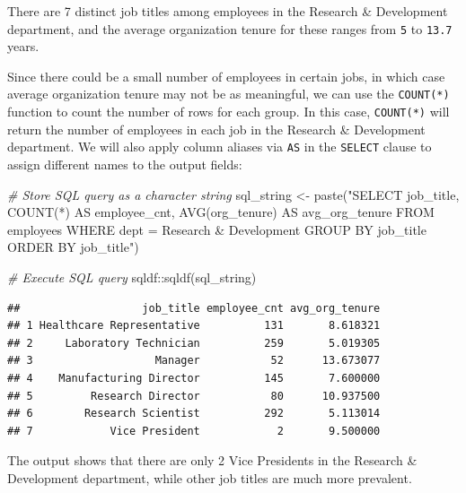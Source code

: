 \documentclass[
]{book}
\newenvironment{Shaded}{\begin{snugshade}}{\end{snugshade}}
\newcommand{\CommentTok}[1]{\textcolor[rgb]{0.56,0.35,0.01}{\textit{#1}}}
\newcommand{\FunctionTok}[1]{\textcolor[rgb]{0.00,0.00,0.00}{#1}}
\newcommand{\NormalTok}[1]{#1}
\newcommand{\OtherTok}[1]{\textcolor[rgb]{0.56,0.35,0.01}{#1}}
\newcommand{\SpecialCharTok}[1]{\textcolor[rgb]{0.00,0.00,0.00}{#1}}
\newcommand{\StringTok}[1]{\textcolor[rgb]{0.31,0.60,0.02}{#1}}
\begin{document}
There are 7 distinct job titles among employees in the Research \& Development department, and the average organization tenure for these ranges from \texttt{5} to \texttt{13.7} years.

Since there could be a small number of employees in certain jobs, in which case average organization tenure may not be as meaningful, we can use the \texttt{COUNT(*)} function to count the number of rows for each group. In this case, \texttt{COUNT(*)} will return the number of employees in each job in the Research \& Development department. We will also apply column aliases via \texttt{AS} in the \texttt{SELECT} clause to assign different names to the output fields:

\begin{Shaded}
\begin{Highlighting}[]
\CommentTok{\# Store SQL query as a character string}
\NormalTok{sql\_string }\OtherTok{\textless{}{-}} \FunctionTok{paste}\NormalTok{(}\StringTok{"SELECT}
\StringTok{                      job\_title,}
\StringTok{                      COUNT(*) AS employee\_cnt,}
\StringTok{                      AVG(org\_tenure) AS avg\_org\_tenure}
\StringTok{                    FROM}
\StringTok{                      employees}
\StringTok{                    WHERE}
\StringTok{                      dept = \textquotesingle{}Research \& Development\textquotesingle{}}
\StringTok{                    GROUP BY}
\StringTok{                      job\_title}
\StringTok{                    ORDER BY}
\StringTok{                      job\_title"}\NormalTok{)}

\CommentTok{\# Execute SQL query}
\NormalTok{sqldf}\SpecialCharTok{::}\FunctionTok{sqldf}\NormalTok{(sql\_string)}
\end{Highlighting}
\end{Shaded}

\begin{verbatim}
##                   job_title employee_cnt avg_org_tenure
## 1 Healthcare Representative          131       8.618321
## 2     Laboratory Technician          259       5.019305
## 3                   Manager           52      13.673077
## 4    Manufacturing Director          145       7.600000
## 5         Research Director           80      10.937500
## 6        Research Scientist          292       5.113014
## 7            Vice President            2       9.500000
\end{verbatim}

The output shows that there are only 2 Vice Presidents in the Research \& Development department, while other job titles are much more prevalent.
\end{document}
